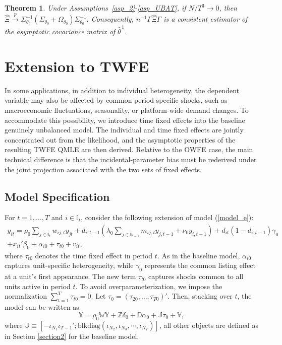 \documentclass[11pt,a4paper]{article}
\newtheorem{theorem}{Theorem}
\begin{document}
\begin{theorem}
Under Assumptions~\ref{asp_2}-\ref{asp_UBAT}, if \(N/T^3\to0\), then
\(
\widehat{\Xi}
\xrightarrow{p}
\Sigma_{\theta_0}^{-1}
(\Sigma_{\theta_0}+\Omega_{\theta_0})
\Sigma_{\theta_0}^{-1}.
\)
Consequently, \(n^{-1}\Gamma\widehat{\Xi}\Gamma\) is a consistent estimator
of the asymptotic covariance matrix of \(\widehat{\theta}^{\,1}\).
\end{theorem}

\section{Extension to TWFE}
\label{sec:twoway_extension}

In some applications, in addition to individual heterogeneity, the dependent variable may also be affected by common period-specific shocks, such as macroeconomic fluctuations, seasonality, or platform-wide demand changes. To accommodate this possibility, we introduce time fixed effects into the baseline genuinely unbalanced model. The individual and time fixed effects are jointly concentrated out from the likelihood, and the asymptotic properties of the resulting TWFE QMLE are then derived. Relative to the OWFE case, the main technical difference is that the incidental-parameter bias must be rederived under the joint projection associated with the two sets of fixed effects.

\subsection{Model Specification}

For $t=1,\ldots,T$ and $i\in \mathbb{I}_t$, consider the following extension of model (\ref{model_e}):
\begin{align}
y_{it}=\rho_0 \sum_{j\in\mathbb{I}_t} w_{ij,t} y_{jt}+d_{i,t-1}
\left(
\lambda_0 \sum_{j\in\mathbb{I}_{t-1}} m_{ij,t} y_{j,t-1}+\nu_0 y_{i,t-1}
\right)+d_{it}(1-d_{i,t-1})\gamma_0\nonumber\\
+x_{it}'\beta_0+\alpha_{i0}+\tau_{t0}+v_{it},\label{model_TWFE}
\end{align}
where $\tau_{t0}$ denotes the time fixed effect in period $t$. As in the baseline model, $\alpha_{i0}$ captures unit-specific heterogeneity, while $\gamma_0$ represents the common listing effect at a unit's first appearance. The new term $\tau_{t0}$ captures shocks common to all units active in period $t$.
To avoid overparameterization, we impose the normalization $\sum_{t=1}^T \tau_{t0}=0.$ Let $\tau_0=(\tau_{20},\ldots,\tau_{T0})'$.
Then, stacking over $t$, the model can be written as
$$\mathbb{Y}=\rho_0 \mathbb{W}\mathbb{Y}+\mathbb{Z}\delta_0+\mathbb{D}\alpha_0+\mathbb{J}\tau_0+\mathbb{V},$$
where $\mathbb{J}\equiv[-\iota_{N_1}\iota_{T-1}';\mathrm{blkdiag}(\iota_{N_2},\iota_{N_3},\cdots,\iota_{N_T})]$, all other objects are defined as in Section \ref{section2} for the baseline model.
\end{document}
